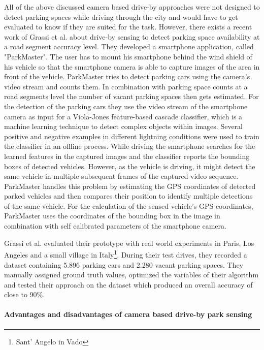 All of the above discussed camera based drive-by approaches were not designed to detect parking spaces while driving through the city and would have to get evaluated to know if they are suited for the task. However, there exists a recent work of Grassi et al. \cite{Grassi:2017:PIE:3132211.3134452} about drive-by sensing to detect parking space availability at a road segment accuracy level. They developed a smartphone application, called "ParkMaster". The user has to mount his smartphone behind the wind shield of his vehicle so that the smartphone camera is able to capture images of the area in front of the vehicle. ParkMaster tries to detect parking cars using the camera's video stream and counts them. In combination with parking space counts at a road segments level the number of vacant parking spaces then gets estimated. For the detection of the parking cars they use the video stream of the smartphone camera as input for a Viola-Jones feature-based cascade classifier, which is a machine learning technique to detect complex objects within images. Several positive and negative examples in different lightning conditions were used to train the classifier in an offline process. While driving the smartphone searches for the learned features in the captured images and the classifier reports the bounding boxes of detected vehicles. However, as the vehicle is driving, it might detect the same vehicle in multiple subsequent frames of the captured video sequence. ParkMaster handles this problem by estimating the GPS coordinates of detected parked vehicles and then compares their position to identify multiple detections of the same vehicle. 
For the calculation of the sensed vehicle's GPS coordinates, ParkMaster uses the coordinates of the bounding box in the image in combination with self calibrated parameters of the smartphone camera.

Grassi et al. evaluated their prototype with real world experiments in Paris, Los Angeles and a small village in Italy\footnote{Sant' Angelo in Vado}. During their test drives, they recorded a dataset containing 5.896 parking cars and 2.280 vacant parking spaces. They manually assigned ground truth values, optimized the variables of their algorithm and tested their approach on the dataset which produced an overall accuracy of close to 90\%.



\paragraph{Advantages and disadvantages of camera based drive-by park sensing}

